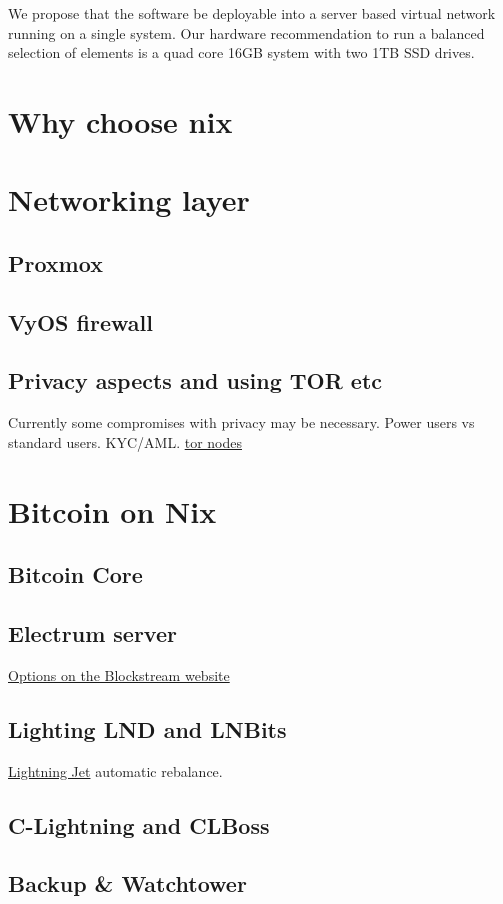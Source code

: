 We propose that the software be deployable into a server based virtual network running on a single system. Our hardware recommendation to run a balanced selection of elements is a quad core 16GB system with two 1TB SSD drives.
\section{Why choose nix}
\lipsum[50]
\section{Networking layer}
\lipsum[50]
\subsection{Proxmox}
\lipsum[50]
\subsection{VyOS firewall}
\lipsum[50]
\subsection{Privacy aspects and using TOR etc}
Currently some compromises with privacy may be necessary. Power users vs standard users. KYC/AML. 
\href{https://bitnodes.io/nodes/?q=.onion}{tor nodes}
\section{Bitcoin on Nix}
\lipsum[50]
\subsection{Bitcoin Core}
\lipsum[50]
\subsection{Electrum server}
\href{https://blog.blockstream.com/en-esplora-and-other-alternatives-to-electrumx/}{Options on the Blockstream website}
\lipsum[50]
\subsection{Lighting LND and LNBits}
\href{https://github.com/itsneski/lightning-jet}{Lightning Jet} automatic rebalance.
\subsection{C-Lightning and CLBoss}
\lipsum[50]
\subsection{Backup \& Watchtower}
\lipsum[50]
